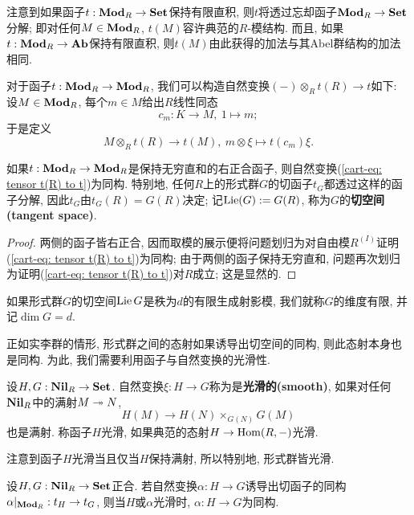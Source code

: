 注意到如果函子$t : \mathbf{Mod}_R\to\mathbf{Set}$保持有限直积, 则$t$将透过忘却函子$\mathbf{Mod}_R\to\mathbf{Set}$分解;
即对任何$M\in\mathbf{Mod}_R$, $t(M)$容许典范的$R$-模结构.
而且, 如果$t : \mathbf{Mod}_R\to\mathbf{Ab}$保持有限直积, 则$t(M)$由此获得的加法与其Abel群结构的加法相同.

对于函子$t : \mathbf{Mod}_R\to\mathbf{Mod}_R$, 我们可以构造自然变换$(-)\otimes_R t(R)\to t$如下:
设$M\in\mathbf{Mod}_R$, 每个$m\in M$给出$R$线性同态\[c_m : K\to M,\ 1\mapsto m;\]
于是定义\begin{equation}\label{cart-eq: tensor t(R) to t}
    M\otimes_R t(R)\to t(M),\ m\otimes\xi\mapsto t(c_m)\xi.
\end{equation}
\begin{defprop}\label{def: tangent space}
    如果$t : \mathbf{Mod}_R\to \mathbf{Mod}_R$是保持无穷直和的右正合函子, 则自然变换(\ref{cart-eq: tensor t(R) to t})为同构.
    特别地, 任何$R$上的形式群$G$的切函子$t_G$都透过这样的函子分解, 因此$t_G$由$t_G(R) = G(R)$决定;
    记$\operatorname{Lie}(G) := G(R)$, 称为$G$的\textbf{切空间(tangent space)}.
\end{defprop}
\begin{proof}
    两侧的函子皆右正合, 因而取模的展示便将问题划归为对自由模$R^{(I)}$证明(\ref{cart-eq: tensor t(R) to t})为同构; 由于两侧的函子保持无穷直和, 问题再次划归为证明(\ref{cart-eq: tensor t(R) to t})对$R$成立; 这是显然的.
\end{proof}

\begin{definition}
    如果形式群$G$的切空间$\operatorname{Lie} G$是秩为$d$的有限生成射影模, 我们就称$G$的维度有限, 并记$\dim G = d$.
\end{definition}

正如实李群的情形,
形式群之间的态射如果诱导出切空间的同构, 则此态射本身也是同构.
为此, 我们需要利用函子与自然变换的光滑性.
\begin{definition}
    设$H, G : \mathbf{Nil}_R\to\mathbf{Set}$. 自然变换$\xi : H\to G$称为是\textbf{光滑的(smooth)},
    如果对任何$\mathbf{Nil}_R$中的满射$M\twoheadrightarrow N$, \[H(M)\to H(N)\times_{G(N)}G(M)\]也是满射.
    称函子$H$光滑, 如果典范的态射$H\to\operatorname{Hom}(R, -)$光滑.
\end{definition}
注意到函子$H$光滑当且仅当$H$保持满射, 所以特别地, 形式群皆光滑.

\begin{theorem}\label{isom of tangent isom}
    \cite[Theorem 2.30]{Zi84}
    设$H, G : \mathbf{Nil}_R\to\mathbf{Set}$正合. 若自然变换$\alpha : H\to G$诱导出切函子的同构$\alpha|_{\mathbf{Mod}_R} : t_H\to t_G$,
    则当$H$或$\alpha$光滑时, $\alpha : H\to G$为同构.
\end{theorem}

